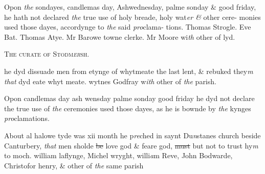 \documentclass[12pt, a4paper]{book}
\begin{document}
 
 	
				\marginpar[\vspace{0.5cm}{\textcolor{Gray}{ceremonies}}]{}
			
 	
		\ifthenelse{\isodd{\thepage}}
		{\reversemarginpar}
		{\normalmarginpar}
		Opon \textit{the} sondayes, candlemas day, Ashwednesday,
 palme sonday \& good friday, he hath not declared
 \textit{the} true use of holy breade, holy wat\textit{er \&} other cere-
 monies used those dayes, accordynge to \textit{the} said \textit{pro}clama-
 tions. Thomas Strogle. Eve Bat. Thomas Atye.
 Mr Barowe towne clerke. Mr Moore wi\textit{th} other of lyd.
 

            
               
				\begin{center} \begin{large} {\scshape The curate of Stodm\textit{er}sh.} \end{large} \end{center}
			

 
 	
				\marginpar[\vspace{0.5cm}{\textcolor{Gray}{lent}}]{}
			
 	
		\ifthenelse{\isodd{\thepage}}
		{\reversemarginpar}
		{\normalmarginpar}
		he dyd dissuade men from etynge of whytmeate the
 last lent, \& rebuked they\textit{m that} dyd eate whyt meate.
 wytnes Godfray w\textit{ith} other of \textit{the} parish.
 
            	
            		
				\marginpar[\vspace{0.5cm}{\textcolor{Gray}{ceremonies}}]{}
			
            		
		\ifthenelse{\isodd{\thepage}}
		{\reversemarginpar}
		{\normalmarginpar}
		Opon candlemas day ash wensday palme sonday good friday
			 he dyd not declare the true use
 of \textit{the} ceremonies used those dayes, as he is bownde
 by \textit{the} kynges \textit{pro}clamations.
            	
            		
				\marginpar[\vspace{0.5cm}{\textcolor{Gray}{n}}]{}
			
            		
		\ifthenelse{\isodd{\thepage}}
		{\reversemarginpar}
		{\normalmarginpar}
		About al halowe tyde was xii month he p\textit{re}ched in saynt
            			Du\textit{n}stanes church beside Canturbery, \textit{that} men sholde \sout{be}
 love god \& feare god, \sout{must} but not to trust hy\textit{m} to moch.
            			william laflynge, Michel wryght, willi\textit{a}m Reve, John
            				Bodwarde, Christofor henry, \& other of \textit{the} same
 parish
 
\end{document}
